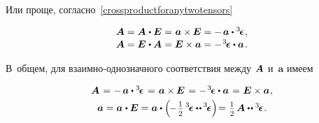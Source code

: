 \begin{otherlanguage}{russian}
Или проще, согласно~\eqref{crossproductforanytwotensors}

\nopagebreak\vspace{-0.1em}\begin{equation*}\begin{array}{c}
\bm{A} = \bm{A} \hspace{.1ex} \dotp \bm{E} = \hspace{.1ex} \bm{a} \times \hspace{-0.1ex} \bm{E} = - \hspace{.3ex} \bm{a} \dotp \levicivitatensor
\hspace{.1ex} ,
\\[.1em]
\bm{A} = \bm{E} \hspace{.1ex} \dotp \bm{A} = \bm{E} \times \bm{a} = - \hspace{.2ex} \levicivitatensor \dotp \bm{a}
\hspace{.2ex} .
\end{array}\end{equation*}

В~общем, для взаимно\hbox{-}однозначного соответствия между~${\hspace{-0.2ex}\bm{A}}$ и~$\bm{a}$ имеем

\nopagebreak\vspace{-0.25em}\begin{equation}\label{companionvector}
\begin{array}{c}
\bm{A} \hspace{.2ex} = \hspace{.1ex} - \hspace{.3ex} \bm{a} \dotp \levicivitatensor \hspace{.2ex} = \hspace{.2ex} \bm{a} \times\hspace{-0.1ex} \bm{E} \hspace{.2ex} = \hspace{.1ex} - \hspace{.2ex} \levicivitatensor \dotp \bm{a} \hspace{.2ex} = \hspace{.1ex} \bm{E} \times \bm{a}
\hspace{.1ex} ,
\\[.3em]
%
\bm{a} = \bm{a} \hspace{.1ex} \dotp \bm{E} = \bm{a} \dotp \left( \hspace{-0.3ex} - \displaystyle \hspace{.2ex} \smalldisplaystyleonehalf \hspace{.4ex} \levicivitatensor \dotdotp \hspace{-0.1ex} \levicivitatensor \right) \hspace{-0.4ex} = \hspace{.1ex} \smalldisplaystyleonehalf \hspace{.32ex} \bm{A} \dotdotp \levicivitatensor
\hspace{.1ex} .
\end{array}
\end{equation}


\end{otherlanguage}
